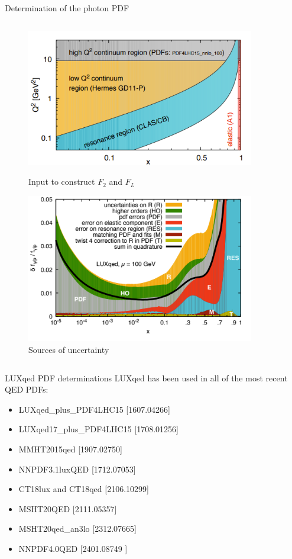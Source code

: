 \documentclass[aspectratio=169, 9pt,t]{beamer}
\begin{document}
\begin{frame}{Determination of the photon PDF}
\begin{columns}[T]
    \begin{column}{0.39\textwidth}
      \vspace*{-2.5em}
      \begin{figure}
        \includegraphics[width=0.89\textwidth]{figures/dataluxqed.png}
        \caption*{Input to construct $F_2$ and $F_L$}
        \includegraphics[width=0.89\textwidth]{figures/luxQED_uncs.png}
        \caption*{Sources of uncertainty}
      \end{figure}
    \end{column}
  \end{columns}
\end{frame}


\begin{frame}{LUXqed PDF determinations}
  LUXqed has been used in all of the most recent QED PDFs:
  \begin{itemize}
      \item LUXqed\_plus\_PDF4LHC15 {\color{gray}\small [1607.04266]}
      \item LUXqed17\_plus\_PDF4LHC15 {\color{gray}\small [1708.01256]}
      \item MMHT2015qed {\color{gray}\small [1907.02750]}
      \item NNPDF3.1luxQED {\color{gray}\small [1712.07053]}
      \item CT18lux and CT18qed {\color{gray}\small [2106.10299]}
      \item MSHT20QED {\color{gray}\small [2111.05357]}
      \item MSHT20qed\_an3lo {\color{gray}\small [2312.07665]}
      \item NNPDF4.0QED {\color{gray}\small [2401.08749 ]}
  \end{itemize}
\end{frame}
\end{document}
